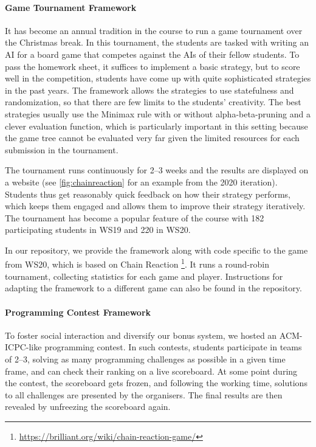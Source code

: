 \paragraph{Game Tournament Framework}
It has become an annual tradition in the course to run a game tournament over the Christmas break.
In this tournament, the students are tasked with writing an AI for a board game that competes against the AIs of their fellow students.
To pass the homework sheet, it suffices to implement a basic strategy, but to score well in the competition, students have come up with quite sophisticated strategies in the past years.
The framework allows the strategies to use statefulness and randomization, so that there are few limits to the students' creativity.
The best strategies usually use the Minimax rule with or without alpha-beta-pruning and a clever evaluation function, which is particularly important in this setting because the game tree cannot be evaluated very far given the limited resources for each submission in the tournament.

The tournament runs continuously for 2--3 weeks and the results are displayed on a website (see \cref{fig:chainreaction} for an example from the 2020 iteration).
Students thus get reasonably quick feedback on how their strategy performs,
which keeps them engaged and allows them to improve their strategy iteratively.
The tournament has become a popular feature of the course with 182 participating students in WS19 and 220 in WS20.

In our repository, we provide the framework along with code specific to the game from WS20, which is based on Chain Reaction \footnote{\url{ https://brilliant.org/wiki/chain-reaction-game/}}.
It runs a round-robin tournament,
collecting statistics for each game and player.
Instructions for adapting the framework to a different game can also be found in the repository.

\paragraph{Programming Contest Framework}\label{sec:contest}
To foster social interaction and diversify our bonus system,
we hosted an ACM-ICPC-like programming contest.
In such contests, students
participate in teams of 2--3,
solving as many programming challenges as possible in a given time frame,
and can check their ranking on a live scoreboard.
At some point during the contest,
the scoreboard gets frozen,
and following the working time,
solutions to all challenges are presented by the organisers.
The final results are then revealed by unfreezing the scoreboard again.

